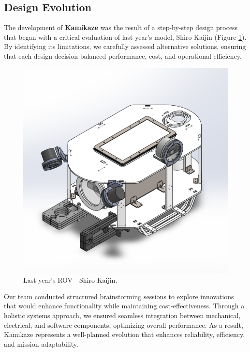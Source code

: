 \subsection{Design Evolution}
The development of \textbf{Kamikaze} was the result of a step-by-step design process that began with a critical evaluation of last year’s model, Shiro Kaijin (Figure \ref{fig:shiro_kaijin}). By identifying its limitations, we carefully assessed alternative solutions, ensuring that each design decision balanced performance, cost, and operational efficiency. 

\begin{figure}[t]
    \centering
    \includegraphics[width=0.8\columnwidth]{Sections/2Design Rationale/images/Shiro Kaijin.png}
    \caption{Last year's ROV - Shiro Kaijin.}
    \label{fig:shiro_kaijin}
\end{figure}

Our team conducted structured brainstorming sessions to explore innovations that would enhance functionality while maintaining cost-effectiveness. Through a holistic systems approach, we ensured seamless integration between mechanical, electrical, and software components, optimizing overall performance. As a result, Kamikaze represents a well-planned evolution that enhances reliability, efficiency, and mission adaptability.

